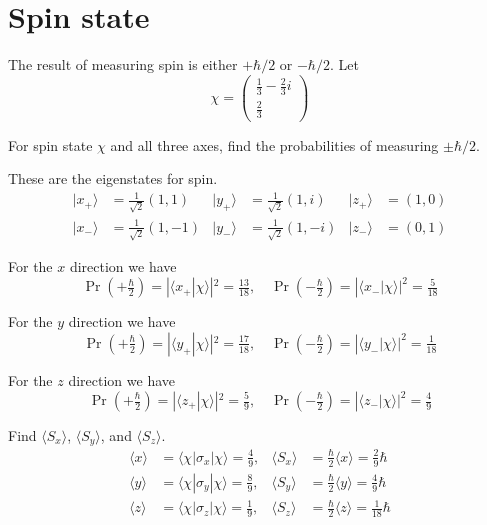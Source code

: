 

\section*{Spin state}

The result of measuring spin is either $+\hbar/2$ or $-\hbar/2$.
Let
\begin{equation*}
\chi=\begin{pmatrix}\frac{1}{3}-\frac{2}{3}i\\[1ex]\frac{2}{3}\end{pmatrix}
\end{equation*}

For spin state $\chi$ and all three axes, find the probabilities of measuring $\pm\hbar/2$.

\bigskip
These are the eigenstates for spin.
\begin{align*}
|x_+\rangle&=\tfrac{1}{\sqrt2}(1,1) &
|y_+\rangle&=\tfrac{1}{\sqrt2}(1,i) &
|z_+\rangle&=(1,0)
\\
|x_-\rangle&=\tfrac{1}{\sqrt2}(1,-1) &
|y_-\rangle&=\tfrac{1}{\sqrt2}(1,-i) &
|z_-\rangle&=(0,1)
\end{align*}

For the $x$ direction we have
\begin{equation*}
\Pr\left(+\tfrac{\hbar}{2}\right)=|\langle x_+|\chi\rangle|^2=\tfrac{13}{18},\quad
\Pr\left(-\tfrac{\hbar}{2}\right)=|\langle x_-|\chi\rangle|^2=\tfrac{5}{18}
\end{equation*}

For the $y$ direction we have
\begin{equation*}
\Pr\left(+\tfrac{\hbar}{2}\right)=|\langle y_+|\chi\rangle|^2=\tfrac{17}{18},\quad
\Pr\left(-\tfrac{\hbar}{2}\right)=|\langle y_-|\chi\rangle|^2=\tfrac{1}{18}
\end{equation*}

For the $z$ direction we have
\begin{equation*}
\Pr\left(+\tfrac{\hbar}{2}\right)=|\langle z_+|\chi\rangle|^2=\tfrac{5}{9},\quad
\Pr\left(-\tfrac{\hbar}{2}\right)=|\langle z_-|\chi\rangle|^2=\tfrac{4}{9}
\end{equation*}

Find $\langle S_x\rangle$, $\langle S_y\rangle$, and $\langle S_z\rangle$.
\begin{align*}
\langle x\rangle&=\langle\chi|\sigma_x|\chi\rangle=\tfrac{4}{9}, &
\langle S_x\rangle&=\tfrac{\hbar}{2}\langle x\rangle=\tfrac{2}{9}\hbar
\\[1ex]
\langle y\rangle&=\langle\chi|\sigma_y|\chi\rangle=\tfrac{8}{9}, &
\langle S_y\rangle&=\tfrac{\hbar}{2}\langle y\rangle=\tfrac{4}{9}\hbar
\\[1ex]
\langle z\rangle&=\langle\chi|\sigma_z|\chi\rangle=\tfrac{1}{9}, &
\langle S_z\rangle&=\tfrac{\hbar}{2}\langle z\rangle=\tfrac{1}{18}\hbar
\end{align*}


